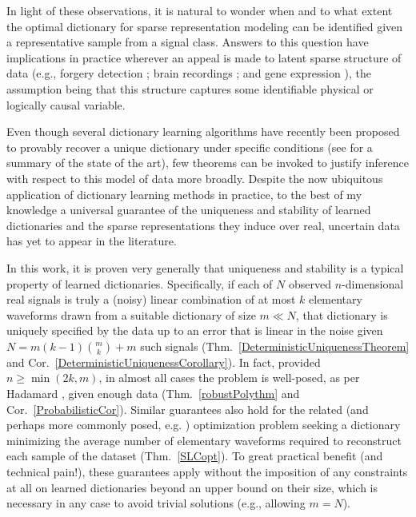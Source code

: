 In light of these observations, it is natural to wonder when and to what extent the optimal dictionary for sparse representation modeling can be identified given a representative sample from a signal class. Answers to this question have implications in practice wherever an appeal is made to latent sparse structure of data (e.g., forgery detection \cite{hughes2010, olshausen2010applied}; brain recordings \cite{jung2001imaging, agarwal2014spatially, lee2016sparse}; and gene expression \cite{wu2016stability}), the assumption being that this structure captures some identifiable physical or logically causal variable. 

Even though several dictionary learning algorithms have recently been proposed to provably recover a unique dictionary under specific conditions (see \cite[Sec.~I-E]{Sun16} for a summary of the state of the art), few theorems can be invoked to justify inference with respect to this model of data more broadly. Despite the now ubiquitous application of dictionary learning methods in practice, to the best of my knowledge a universal guarantee of the uniqueness and stability of learned dictionaries and the sparse representations they induce over real, uncertain data has yet to appear in the literature. 

In this work, it is proven very generally that uniqueness and stability is a typical property of learned dictionaries. 
Specifically, if each of $N$ observed $n$-dimensional real signals is truly a (noisy) linear combination of at most $k$ elementary waveforms drawn from a suitable dictionary of size $m \ll N$, that dictionary is uniquely specified by the data up to an error that is linear in the noise given \mbox{$N = m(k-1){m \choose k} + m$} such signals (Thm.~\ref{DeterministicUniquenessTheorem} and Cor.~\ref{DeterministicUniquenessCorollary}). In fact, provided $n \geq \min(2k,m)$, in almost all cases the problem is well-posed, as per Hadamard \cite{Hadamard1902}, given enough data (Thm.~\ref{robustPolythm} and Cor.~\ref{ProbabilisticCor}). 
Similar guarantees also hold for the related (and perhaps more commonly posed, e.g. \cite{rehnsommer2007}) optimization problem seeking a dictionary minimizing the average number of elementary waveforms required to reconstruct each sample of the dataset (Thm.~\ref{SLCopt}). To great practical benefit (and technical pain!), these guarantees apply without the imposition of any constraints at all on learned dictionaries beyond an upper bound on their size, which is necessary in any case to avoid trivial solutions (e.g., allowing $m = N$). %

